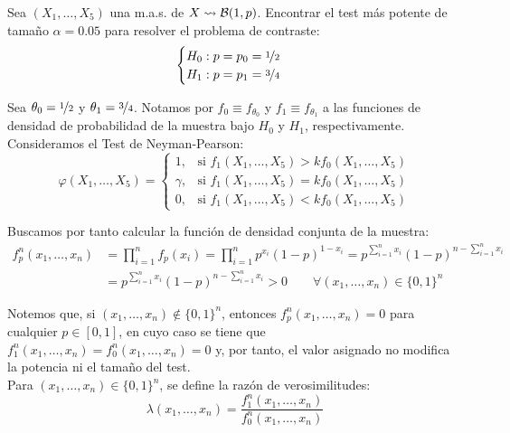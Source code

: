 \begin{ejemplo}
    Sea $(X_1, \dots, X_5)$ una m.a.s. de $X\rightsquigarrow \mathcal{B}(1,p)$. Encontrar el test más potente de tamaño $\alpha = 0.05$ para resolver el problema de contraste:
    \begin{align*}
        \begin{cases}
        H_0: p = p_0 = \nicefrac{1}{2} \\
        H_1: p = p_1 = \nicefrac{3}{4}
        \end{cases}
    \end{align*}

    Sea $\theta_0=\nicefrac{1}{2}$ y $\theta_1=\nicefrac{3}{4}$. Notamos por $f_0\equiv f_{\theta_0}$ y $f_1\equiv f_{\theta_1}$ a las funciones de densidad de probabilidad de la muestra bajo $H_0$ y $H_1$, respectivamente. Consideramos el Test de Neyman-Pearson:
    \begin{equation*}
        \varphi(X_1, \dots, X_5) =
        \begin{cases}
            1, & \text{si } f_1(X_1, \dots, X_5) > k f_0(X_1, \dots, X_5) \\
            \gamma, & \text{si } f_1(X_1, \dots, X_5) = k f_0(X_1, \dots, X_5) \\
            0, & \text{si } f_1(X_1, \dots, X_5) < k f_0(X_1, \dots, X_5)
        \end{cases}
    \end{equation*}

    Buscamos por tanto calcular la función de densidad conjunta de la muestra:
    \begin{align*}
        f_p^n (x_1, \dots, x_n) &= \prod_{i=1}^{n} f_p(x_i) = \prod_{i=1}^{n} p^{x_i}(1-p)^{1-x_i} = p^{\sum\limits_{i=1}^{n} x_i}(1-p)^{n-\sum\limits_{i=1}^{n} x_i} \\
        &= p^{\sum\limits_{i=1}^{n} x_i}(1-p)^{n-\sum\limits_{i=1}^{n} x_i}>0\qquad \forall (x_1, \dots, x_n) \in \{0,1\}^n
    \end{align*}

    Notemos que, si $(x_1, \dots, x_n) \notin \{0,1\}^n$, entonces $f_p^n (x_1, \dots, x_n) = 0$ para cualquier $p\in[0,1]$, en cuyo caso se tiene que $f_1^n (x_1, \dots, x_n) = f_0^n (x_1, \dots, x_n) = 0$ y, por tanto, el valor asignado no modifica la potencia ni el tamaño del test.\\
    
    Para $(x_1, \dots, x_n) \in \{0,1\}^n$, se define la razón de verosimilitudes:
    \begin{equation*}
        \lambda(x_1, \dots, x_n) = \frac{f_1^n(x_1, \dots, x_n)}{f_0^n(x_1, \dots, x_n)}
    \end{equation*}


\end{ejemplo}
